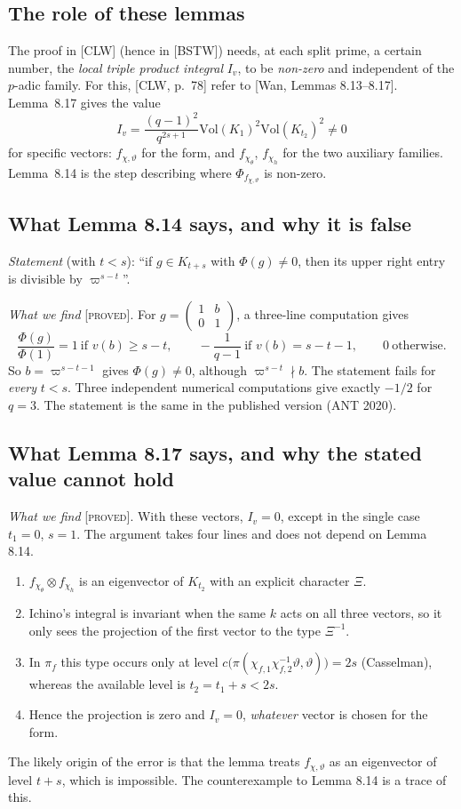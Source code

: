 \documentclass[11pt]{amsart}
\newcommand{\stat}[1]{\textsc{[#1]}}
\newcommand{\Vol}{\mathrm{Vol}}
\begin{document}
\subsection*{The role of these lemmas}
The proof in [CLW] (hence in [BSTW]) needs, at each split prime, a certain number, the \emph{local triple product integral} $I_v$, to be \emph{non-zero} and independent of the $p$-adic family. For this, [CLW, p.~78] refer to [Wan, Lemmas 8.13--8.17]. Lemma~8.17 gives the value
\[
I_v=\frac{(q-1)^2}{q^{2s+1}}\Vol(K_1)^2\Vol(K_{t_2})^2\neq0
\]
for specific vectors: $f_{\chi,\vartheta}$ for the form, and $f_{\chi_\theta}$, $f_{\chi_h}$ for the two auxiliary families. Lemma~8.14 is the step describing where $\Phi_{f_{\chi,\vartheta}}$ is non-zero.

\subsection*{What Lemma 8.14 says, and why it is false}
\emph{Statement} (with $t<s$): ``if $g\in K_{t+s}$ with $\Phi(g)\neq0$, then its upper right entry is divisible by $\varpi^{s-t}$''.

\emph{What we find} \stat{proved}. For $g=\begin{pmatrix}1&b\\0&1\end{pmatrix}$, a three-line computation gives
\[
\frac{\Phi(g)}{\Phi(1)}=1\ \text{if } v(b)\ge s-t,\qquad -\frac{1}{q-1}\ \text{if } v(b)=s-t-1,\qquad 0\ \text{otherwise}.
\]
So $b=\varpi^{s-t-1}$ gives $\Phi(g)\neq0$, although $\varpi^{s-t}\nmid b$. The statement fails for \emph{every} $t<s$. Three independent numerical computations give exactly $-1/2$ for $q=3$. The statement is the same in the published version (ANT 2020).

\subsection*{What Lemma 8.17 says, and why the stated value cannot hold}
\emph{What we find} \stat{proved}. With these vectors, $I_v=0$, except in the single case $t_1=0$, $s=1$. The argument takes four lines and does not depend on Lemma 8.14.
\begin{enumerate}[label=(\roman*)]
\item $f_{\chi_\theta}\otimes f_{\chi_h}$ is an eigenvector of $K_{t_2}$ with an explicit character $\Xi$.
\item Ichino's integral is invariant when the same $k$ acts on all three vectors, so it only sees the projection of the first vector to the type $\Xi^{-1}$.
\item In $\pi_f$ this type occurs only at level $c\big(\pi(\chi_{f,1}\chi_{f,2}^{-1}\vartheta,\vartheta)\big)=2s$ (Casselman), whereas the available level is $t_2=t_1+s<2s$.
\item Hence the projection is zero and $I_v=0$, \emph{whatever} vector is chosen for the form.
\end{enumerate}
The likely origin of the error is that the lemma treats $f_{\chi,\vartheta}$ as an eigenvector of level $t+s$, which is impossible. The counterexample to Lemma 8.14 is a trace of this.
\end{document}
